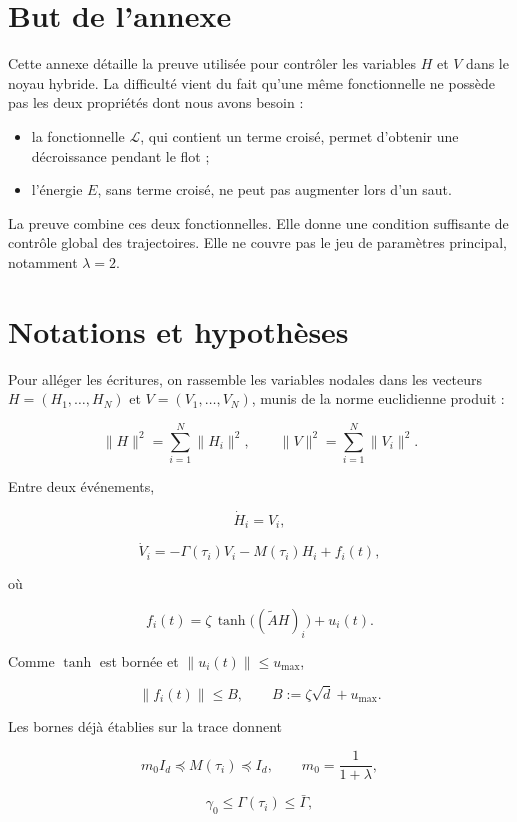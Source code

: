 \section{But de l'annexe}\label{annexe-energie-but}

Cette annexe détaille la preuve utilisée pour contrôler les variables
\(H\) et \(V\) dans le noyau hybride. La difficulté vient du fait qu'une
même fonctionnelle ne possède pas les deux propriétés dont nous avons
besoin :

\begin{itemize}
\item
  la fonctionnelle \(\mathcal L\), qui contient un terme croisé, permet
  d'obtenir une décroissance pendant le flot ;
\item
  l'énergie \(E\), sans terme croisé, ne peut pas augmenter lors d'un
  saut.
\end{itemize}

La preuve combine ces deux fonctionnelles. Elle donne une condition
suffisante de contrôle global des trajectoires. Elle ne couvre pas le
jeu de paramètres principal, notamment \(\lambda=2\).

\section{Notations et hypothèses}\label{annexe-energie-hypotheses}

Pour alléger les écritures, on rassemble les variables nodales dans les
vecteurs \(H=(H_1,\ldots,H_N)\) et \(V=(V_1,\ldots,V_N)\), munis de la
norme euclidienne produit :

\[
\|H\|^2=\sum_{i=1}^N\|H_i\|^2,
\qquad
\|V\|^2=\sum_{i=1}^N\|V_i\|^2.
\]

Entre deux événements,

\[
\dot H_i=V_i,
\]

\[
\dot V_i
=
-\Gamma(\tau_i)V_i
-M(\tau_i)H_i
+f_i(t),
\]

où

\[
f_i(t)
=
\zeta\,\tanh\!\bigl((\widetilde A H)_i\bigr)+u_i(t).
\]

Comme \(\tanh\) est bornée et \(\|u_i(t)\|\leq u_{\max}\),

\[
\|f_i(t)\|
\leq
B,
\qquad
B:=\zeta\sqrt d+u_{\max}.
\]

Les bornes déjà établies sur la trace donnent

\[
m_0I_d\preceq M(\tau_i)\preceq I_d,
\qquad
m_0=\frac{1}{1+\lambda},
\]

\[
\gamma_0
\leq
\Gamma(\tau_i)
\leq
\bar\Gamma,
\]

